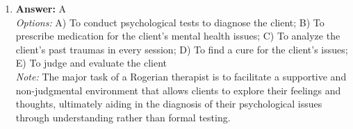 \documentclass[12pt]{article}
\begin{document}
\begin{enumerate}[label=\arabic*.]
\\ \textit{Note:} Family dynamics are likely to be affected during the first few sessions of psychotherapy because the phase model emphasizes the initial focus on interpersonal relationships and understanding the client's context within their family system.
\item \textbf{Answer:} A
\\ \textit{Options:} A) To conduct psychological tests to diagnose the client; B) To prescribe medication for the client's mental health issues; C) To analyze the client's past traumas in every session; D) To find a cure for the client's issues; E) To judge and evaluate the client
\\ \textit{Note:} The major task of a Rogerian therapist is to facilitate a supportive and non-judgmental environment that allows clients to explore their feelings and thoughts, ultimately aiding in the diagnosis of their psychological issues through understanding rather than formal testing.
\end{enumerate}
\end{document}
